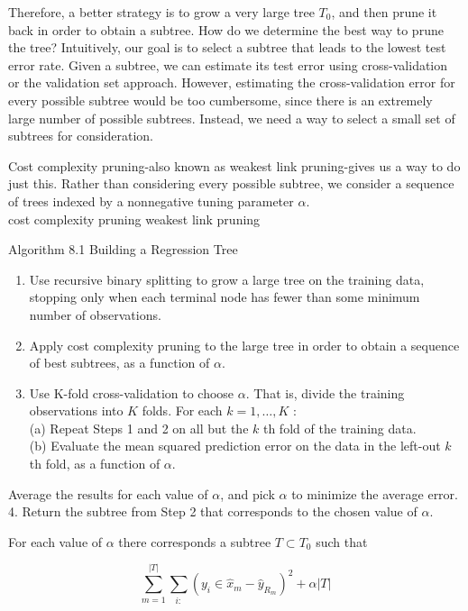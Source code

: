 \documentclass[10pt]{article}
\begin{document}
Therefore, a better strategy is to grow a very large tree $T_{0}$, and then prune it back in order to obtain a subtree. How do we determine the best way to prune the tree? Intuitively, our goal is to select a subtree that leads to the lowest test error rate. Given a subtree, we can estimate its test error using cross-validation or the validation set approach. However, estimating the cross-validation error for every possible subtree would be too cumbersome, since there is an extremely large number of possible subtrees. Instead, we need a way to select a small set of subtrees for consideration.

Cost complexity pruning-also known as weakest link pruning-gives us a way to do just this. Rather than considering every possible subtree, we consider a sequence of trees indexed by a nonnegative tuning parameter $\alpha$.\\
cost complexity pruning weakest link pruning

Algorithm 8.1 Building a Regression Tree

\begin{enumerate}
  \item Use recursive binary splitting to grow a large tree on the training data, stopping only when each terminal node has fewer than some minimum number of observations.
  \item Apply cost complexity pruning to the large tree in order to obtain a sequence of best subtrees, as a function of $\alpha$.
  \item Use K-fold cross-validation to choose $\alpha$. That is, divide the training observations into $K$ folds. For each $k=1, \ldots, K$ :\\
(a) Repeat Steps 1 and 2 on all but the $k$ th fold of the training data.\\
(b) Evaluate the mean squared prediction error on the data in the left-out $k$ th fold, as a function of $\alpha$.
\end{enumerate}

Average the results for each value of $\alpha$, and pick $\alpha$ to minimize the average error.\\
4. Return the subtree from Step 2 that corresponds to the chosen value of $\alpha$.

For each value of $\alpha$ there corresponds a subtree $T \subset T_{0}$ such that


\begin{equation*}
\sum_{m=1}^{|T|} \sum_{i:}\left(y_{i} \in \hat{x}_{m}-\hat{y}_{R_{m}}\right)^{2}+\alpha|T| \tag{8.4}
\end{equation*}
\end{document}
